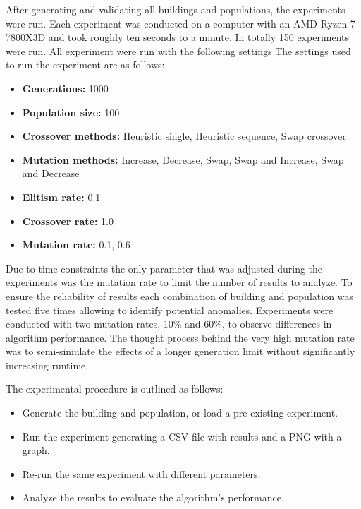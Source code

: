 After generating and validating all buildings and populations, the experiments were run. Each experiment was conducted on a computer with an AMD Ryzen 7 7800X3D and took roughly ten seconds to a minute. In totally 150 experiments were run.
All experiment were run with the following settings 
\newpage
The settings used to run the experiment are as follows:

\begin{itemize}
    \item \textbf{Generations:} 1000
    \item \textbf{Population size:} 100
    \item \textbf{Crossover methods:} Heuristic single, Heuristic sequence, Swap crossover
    \item \textbf{Mutation methods:} Increase, Decrease, Swap, Swap and Increase, Swap and Decrease
    \item \textbf{Elitism rate:} 0.1
    \item \textbf{Crossover rate:} 1.0
    \item \textbf{Mutation rate:} 0.1, 0.6
\end{itemize}


Due to time constraints the only parameter that was adjusted during the experiments was the mutation rate to limit the number of results to analyze.
To ensure the reliability of results each combination of building and population was tested five times allowing to identify potential anomalies. Experiments were conducted with two mutation rates, 10\% and 60\%, to observe differences in algorithm performance.
The thought process behind the very high mutation rate was to semi-simulate the effects of a longer generation limit without significantly increasing runtime.

The experimental procedure is outlined as follows:

\begin{itemize}
	\item Generate the building and population, or load a pre-existing experiment.
	\item Run the experiment generating a CSV file with results and a PNG with a graph.
	\item Re-run the same experiment with different parameters.
	\item Analyze the results to evaluate the algorithm's performance.
\end{itemize}
